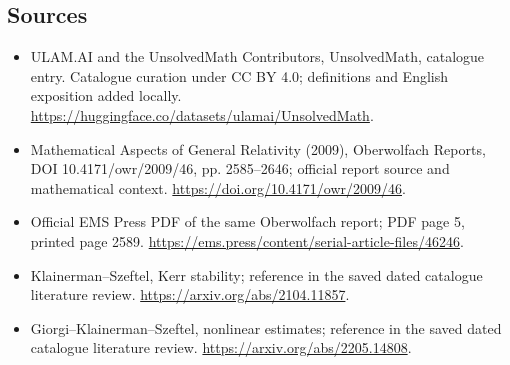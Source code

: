 \documentclass[11pt]{article}
\begin{document}
\subsection{Sources}
\begin{itemize}
\item[\hypertarget{source:statement:1}{S1}] ULAM.AI and the UnsolvedMath Contributors, UnsolvedMath, catalogue entry. Catalogue curation under CC BY 4.0; definitions and English exposition added locally.
\url{https://huggingface.co/datasets/ulamai/UnsolvedMath}.
\item[\hypertarget{source:statement:2}{S2}] Mathematical Aspects of General Relativity (2009), Oberwolfach Reports, DOI 10.4171/owr/2009/46, pp. 2585--2646; official report source and mathematical context.
\url{https://doi.org/10.4171/owr/2009/46}.
\item[\hypertarget{source:statement:3}{S3}] Official EMS Press PDF of the same Oberwolfach report; PDF page 5, printed page 2589.
\url{https://ems.press/content/serial-article-files/46246}.
\item[\hypertarget{source:statement:4}{S4}] Klainerman--Szeftel, Kerr stability; reference in the saved dated catalogue literature review.
\url{https://arxiv.org/abs/2104.11857}.
\item[\hypertarget{source:statement:5}{S5}] Giorgi--Klainerman--Szeftel, nonlinear estimates; reference in the saved dated catalogue literature review.
\url{https://arxiv.org/abs/2205.14808}.
\end{itemize}
\label{end:statement}
\end{document}
